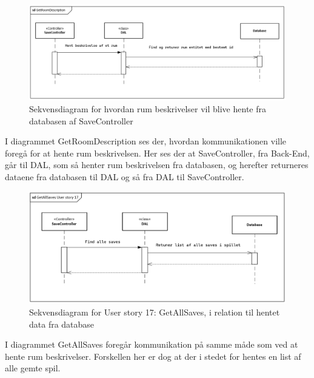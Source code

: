 \begin{figure}[H]
\centering
\includegraphics[width = \textwidth]{02-Body/Images/RoomDescriptionsDB.PNG}
\caption{Sekvensdiagram for hvordan rum beskrivelser vil blive hente fra databasen af SaveController}
\label{fig:RoomDescriptionsDB}
\end{figure}

I diagrammet GetRoomDescription ses der, hvordan kommunikationen ville foregå for at hente rum beskrivelsen. Her ses der at SaveController, fra Back-End, går til DAL, som så henter rum beskrivelsen fra databasen, og herefter returneres dataene fra databasen til DAL og så fra DAL til SaveController.

\begin{figure}[H]
\centering
\includegraphics[width = \textwidth]{02-Body/Images/GetAllSavesDB.PNG}
\caption{Sekvensdiagram for User story 17: GetAllSaves, i relation til hentet data fra database}
\label{fig:GetAllSavesDB}
\end{figure}

I diagrammet GetAllSaves foregår kommunikation på samme måde som ved at hente rum beskrivelser. Forskellen her er dog at der i stedet for hentes en list af alle gemte spil.

